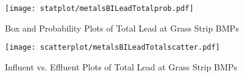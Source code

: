         \begin{figure}[hb]   %
            \centering
            \texttt{[image: statplot/metalsBILeadTotalprob.pdf]}
            \caption{Box and Probability Plots of Total Lead at Grass Strip BMPs}
        \end{figure}         %
        
        
        \begin{figure}[hb]   %
            \centering
            \texttt{[image: scatterplot/metalsBILeadTotalscatter.pdf]}
            \caption{Influent vs. Effluent Plots of Total Lead at Grass Strip BMPs}
        \end{figure}         %
        \clearpage
        